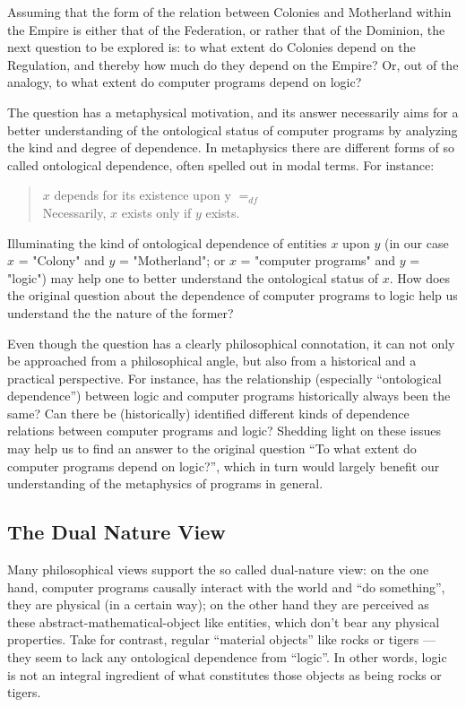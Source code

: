 \documentclass[]{article}
\begin{document}
{\color{red}{this passage is inspired by Nick's note}}

Assuming that the form of the relation between Colonies and Motherland within the Empire is either that of the Federation, or rather that of the Dominion, the next question to be explored is: to what extent do Colonies depend on the Regulation, and thereby how much do they depend on the Empire? Or, out of the analogy, to what extent do computer programs depend on logic?

The question has a metaphysical motivation, and its answer necessarily aims for a better understanding of the ontological status of computer programs by analyzing the kind and degree of dependence. In metaphysics there are different forms of so called ontological dependence, often spelled out in modal terms. For instance:

\begin{quote}
$x$ depends for its existence upon y $=_{df}$\\
Necessarily, $x$ exists only if $y$ exists.
\end{quote}
%
Illuminating the kind of ontological dependence of entities $x$ upon $y$ (in
our case $x$ = "Colony" and $y$ = "Motherland"; or $x$ = "computer programs" and $y$ = "logic") may help one to better understand the ontological status of $x$. How does the original question about the dependence of computer programs to logic help us understand the the nature of the former? 

Even though the question has a clearly philosophical connotation, it can
not only be approached from a philosophical angle, but also from a historical
and a practical perspective. For instance, has the relationship (especially
``ontological dependence”) between logic and computer programs historically
always been the same? Can there be (historically) identified different kinds of
dependence relations between computer programs and logic? Shedding light
on these issues may help us to find an answer to the original question “To
what extent do computer programs depend on logic?”, which in turn would
largely benefit our understanding of the metaphysics of programs in general.


\subsection{The Dual Nature View}

Many philosophical views support the so called dual-nature view:  on the one hand, computer programs causally interact with the world and ``do something”, they are physical (in a certain way); on the other hand they are perceived as these abstract-mathematical-object like entities, which don't bear any physical properties.
Take for contrast, regular ``material objects” like rocks or tigers --- they
seem to lack any ontological dependence from ``logic”. In other words, logic is
not an integral ingredient of what constitutes those objects as being rocks or
tigers. 
\end{document}
